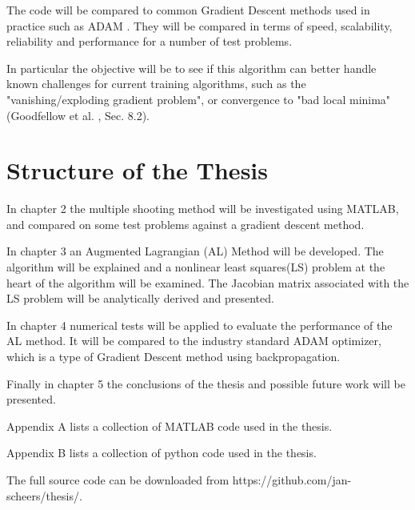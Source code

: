 The code will be compared to common Gradient Descent methods used in practice such as ADAM \cite{kingma2017adam}. They will be compared in terms of speed, scalability, reliability and performance for a number of test problems.

In particular the objective will be to see if this algorithm can better handle known challenges for current training algorithms, such as the "vanishing/exploding gradient problem", or convergence to "bad local minima" (Goodfellow et al. \cite{Goodfellow-et-al-2016}, Sec. 8.2).

\section{Structure of the Thesis}
In chapter 2 the multiple shooting method will be investigated using MATLAB, and compared on some test problems against a gradient descent method.

In chapter 3 an Augmented Lagrangian (AL) Method will be developed. The algorithm will be explained and a nonlinear least squares(LS) problem at the heart of the algorithm will be examined. The Jacobian matrix associated with the LS problem will be analytically derived and presented.

In chapter 4 numerical tests will be applied to evaluate the performance of the AL method. It will be compared to the industry standard ADAM optimizer, which is a type of Gradient Descent method using backpropagation.

Finally in chapter 5 the conclusions of the thesis and possible future work will be presented.

Appendix A lists a collection of MATLAB code used in the thesis.

Appendix B lists a collection of python code used in the thesis.

The full source code can be downloaded from https://github.com/jan-scheers/thesis/.



